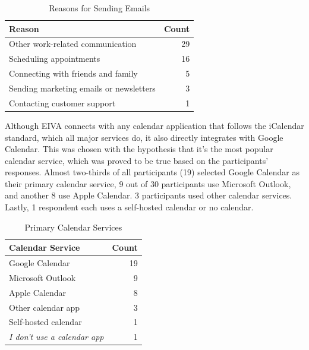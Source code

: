 \documentclass{article}
\begin{document}
\begin{table}[!htb]
	\begin{minipage}{1\linewidth}
		\caption{Reasons for Sending Emails}
		\centering
		\begin{tabular}{lr}
			\hline
			\textbf{Reason}                         & \textbf{Count} \\
			\hline
			Other work-related communication        & 29             \\
			Scheduling appointments                 & 16             \\
			Connecting with friends and family      & 5              \\
			Sending marketing emails or newsletters & 3              \\
			Contacting customer support             & 1              \\
			\hline
		\end{tabular}
	\end{minipage}%
\end{table}

Although EIVA connects with any calendar application that follows the iCalendar standard, which all major services do, it also directly integrates with Google Calendar. This was chosen with the hypothesis that it's the most popular calendar service, which was proved to be true based on the participants' responses. Almost two-thirds of all participants (19) selected Google Calendar as their primary calendar service, 9 out of 30 participants use Microsoft Outlook, and another 8 use Apple Calendar. 3 participants used other calendar services. Lastly, 1 respondent each uses a self-hosted calendar or no calendar.

\begin{table}[!htb]
	\begin{minipage}{1\linewidth}
		\caption{Primary Calendar Services}
		\centering
		\begin{tabular}{lr}
			\hline
			\textbf{Calendar Service}         & \textbf{Count} \\
			\hline
			Google Calendar                   & 19             \\
			Microsoft Outlook                 & 9              \\
			Apple Calendar                    & 8              \\
			Other calendar app                & 3              \\
			Self-hosted calendar              & 1              \\
			\emph{I don't use a calendar app} & 1              \\
			\hline
		\end{tabular}
	\end{minipage}%
\end{table}
\end{document}
